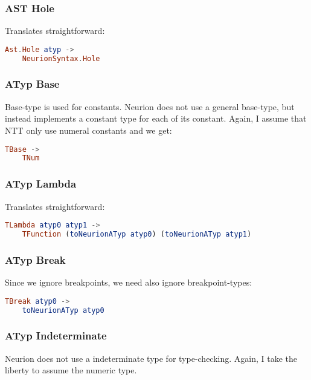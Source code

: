 \documentclass[10pt,a4paper,english]{article}
\begin{document}
\subsubsection*{AST Hole}
Translates straightforward:
\begin{lstlisting}[language=elm,%
                     label="eval-evaluated",%
                     gobble=0,%
                     ]
Ast.Hole atyp ->
    NeurionSyntax.Hole
\end{lstlisting}
\subsubsection*{ATyp Base}
Base-type is used for constants. Neurion does not use a general base-type, but instead implements a constant type for each of its constant. Again, I assume that NTT only use numeral constants and we get:
\begin{lstlisting}[language=elm,%
                     label="eval-evaluated",%
                     gobble=0,%
                     ]
TBase ->
    TNum
\end{lstlisting}
\subsubsection*{ATyp Lambda}
Translates straightforward:
\begin{lstlisting}[language=elm,%
                     label="eval-evaluated",%
                     gobble=0,%
                     ]
TLambda atyp0 atyp1 ->
    TFunction (toNeurionATyp atyp0) (toNeurionATyp atyp1)
\end{lstlisting}
\subsubsection*{ATyp Break}
Since we ignore breakpoints, we need also ignore breakpoint-types:
\begin{lstlisting}[language=elm,%
                     label="eval-evaluated",%
                     gobble=0,%
                     ]
TBreak atyp0 ->
    toNeurionATyp atyp0
\end{lstlisting}
\subsubsection*{ATyp Indeterminate}
Neurion does not use a indeterminate type for type-checking. Again, I take the liberty to assume the numeric type.
\end{document}
